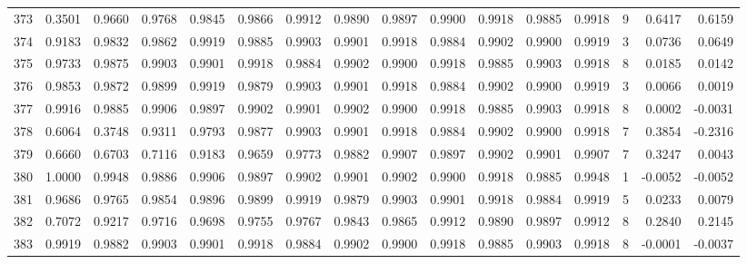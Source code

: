 \begin{tabular}{lrrrrrrrrrrrrrrr}
373 &      0.3501 &  0.9660 &  0.9768 &  0.9845 &  0.9866 &  0.9912 &  0.9890 &  0.9897 &  0.9900 &  0.9918 &   0.9885 &     0.9918 &      9 &                    0.6417 &                     0.6159 \\
374 &      0.9183 &  0.9832 &  0.9862 &  0.9919 &  0.9885 &  0.9903 &  0.9901 &  0.9918 &  0.9884 &  0.9902 &   0.9900 &     0.9919 &      3 &                    0.0736 &                     0.0649 \\
375 &      0.9733 &  0.9875 &  0.9903 &  0.9901 &  0.9918 &  0.9884 &  0.9902 &  0.9900 &  0.9918 &  0.9885 &   0.9903 &     0.9918 &      8 &                    0.0185 &                     0.0142 \\
376 &      0.9853 &  0.9872 &  0.9899 &  0.9919 &  0.9879 &  0.9903 &  0.9901 &  0.9918 &  0.9884 &  0.9902 &   0.9900 &     0.9919 &      3 &                    0.0066 &                     0.0019 \\
377 &      0.9916 &  0.9885 &  0.9906 &  0.9897 &  0.9902 &  0.9901 &  0.9902 &  0.9900 &  0.9918 &  0.9885 &   0.9903 &     0.9918 &      8 &                    0.0002 &                    -0.0031 \\
378 &      0.6064 &  0.3748 &  0.9311 &  0.9793 &  0.9877 &  0.9903 &  0.9901 &  0.9918 &  0.9884 &  0.9902 &   0.9900 &     0.9918 &      7 &                    0.3854 &                    -0.2316 \\
379 &      0.6660 &  0.6703 &  0.7116 &  0.9183 &  0.9659 &  0.9773 &  0.9882 &  0.9907 &  0.9897 &  0.9902 &   0.9901 &     0.9907 &      7 &                    0.3247 &                     0.0043 \\
380 &      1.0000 &  0.9948 &  0.9886 &  0.9906 &  0.9897 &  0.9902 &  0.9901 &  0.9902 &  0.9900 &  0.9918 &   0.9885 &     0.9948 &      1 &                   -0.0052 &                    -0.0052 \\
381 &      0.9686 &  0.9765 &  0.9854 &  0.9896 &  0.9899 &  0.9919 &  0.9879 &  0.9903 &  0.9901 &  0.9918 &   0.9884 &     0.9919 &      5 &                    0.0233 &                     0.0079 \\
382 &      0.7072 &  0.9217 &  0.9716 &  0.9698 &  0.9755 &  0.9767 &  0.9843 &  0.9865 &  0.9912 &  0.9890 &   0.9897 &     0.9912 &      8 &                    0.2840 &                     0.2145 \\
383 &      0.9919 &  0.9882 &  0.9903 &  0.9901 &  0.9918 &  0.9884 &  0.9902 &  0.9900 &  0.9918 &  0.9885 &   0.9903 &     0.9918 &      8 &                   -0.0001 &                    -0.0037 \\

\end{tabular}
